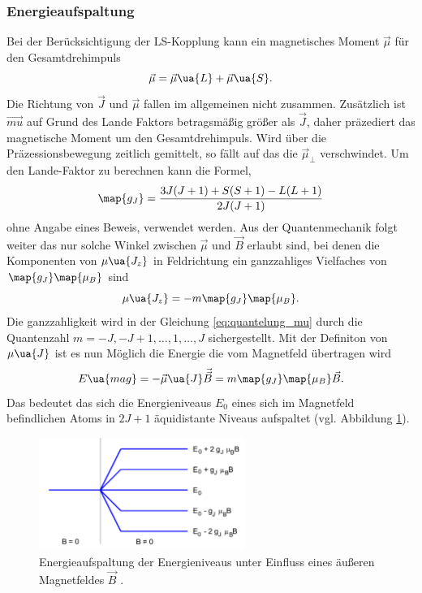 \subsubsection{Energieaufspaltung}
Bei der Berücksichtigung der LS-Kopplung kann ein magnetisches Moment $\vec{\mu}$ für den Gesamtdrehimpuls
\begin{equation*}
  \vec{\mu}=\vec{\mu}\ua{L} + \vec{\mu}\ua{S}.
\end{equation*}
Die Richtung von $\vec{J}$ und $\vec{\mu}$ fallen im allgemeinen nicht zusammen. Zusätzlich ist
$\vec{mu}$ auf Grund des Lande Faktors betragsmäßig größer als $\vec{J}$, daher präzediert das magnetische Moment um den Gesamtdrehimpuls.
Wird über die Präzessionsbewegung zeitlich gemittelt, so fällt auf das die $\vec{\mu}_{\perp}$ verschwindet.
Um den Lande-Faktor zu berechnen kann die Formel,
\begin{equation}
  \label{eq:lande_faktor}
  \map{g_J}=\frac{3J(J+1)+S(S+1)-L(L+1)}{2J(J+1)}
\end{equation}
ohne Angabe eines Beweis, verwendet werden.
Aus der Quantenmechanik folgt weiter das nur solche Winkel zwischen $\vec{\mu}$ und
$\vec{B}$ erlaubt sind, bei denen die Komponenten von $\mu\ua{J_z}$ in Feldrichtung ein ganzzahliges Vielfaches von
$\map{g_J}\map{\mu_B}$ sind
\begin{equation}
  \label{eq:quantelung_mu}
  \mu\ua{J_z}=-m\map{g_J}\map{\mu_B}.
\end{equation}
Die ganzzahligkeit wird in der Gleichung \eqref{eq:quantelung_mu} durch die Quantenzahl
$m=-J,-J+1,\dots,1,\dots, J$ sichergestellt.
Mit der Definiton von $\mu\ua{J}$ ist es nun Möglich die Energie die vom Magnetfeld
übertragen wird
\begin{equation}
  \label{eq:energie_mag}
  E\ua{mag}=-\vec{\mu}\ua{J}\vec{\vec{B}}=m\map{g_J}\map{\mu_B}\vec{B}.
\end{equation}
Das bedeutet das sich die Energieniveaus $E_0$ eines sich im Magnetfeld befindlichen Atoms
in $2J+1$ äquidistante Niveaus aufspaltet (vgl. Abbildung \ref{fig: energie_magnet}).
\FloatBarrier
\begin{figure}[h]
  \centering
  \includegraphics[width=0.6\textwidth]{pics/energieaufspaltung_magnetfeld.png}
  \caption{Energieaufspaltung der Energieniveaus unter Einfluss eines äußeren Magnetfeldes $\vec{B}$ \cite{anleitung27}.}
  \label{fig: energie_magnet}
\end{figure}
\FloatBarrier

